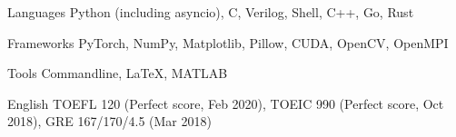 

\begin{cvskills}

  \cvskill
    {Languages} %
    {Python (including asyncio), C, Verilog, Shell, C++, Go, Rust} %

  \cvskill
    {Frameworks} %
    {PyTorch, NumPy, Matplotlib, Pillow, CUDA, OpenCV, OpenMPI} %

  \cvskill
    {Tools} %
    {Commandline, LaTeX, MATLAB} %

  \cvskill
    {English} %
    {TOEFL 120 (Perfect score, Feb 2020), TOEIC 990 (Perfect score, Oct 2018), GRE 167/170/4.5 (Mar 2018)} %

\end{cvskills}
